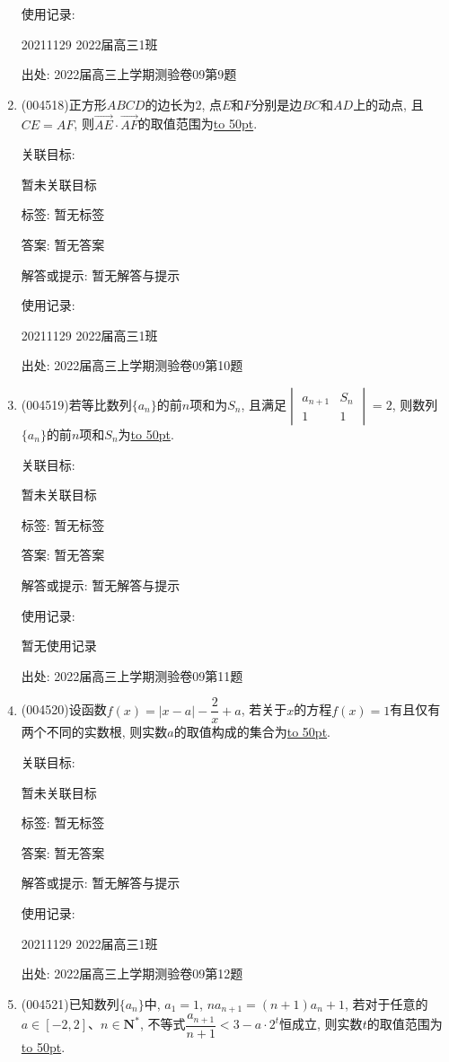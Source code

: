 \documentclass[10pt,a4paper]{article}
\newcommand{\blank}[1]{\underline{\hbox to #1pt{}}}
\begin{document}
\begin{enumerate}[1.]
使用记录:

20211129	2022届高三1班	


出处: 2022届高三上学期测验卷09第9题
\item { (004518)}正方形$ABCD$的边长为$2$, 点$E$和$F$分别是边$BC$和$AD$上的动点, 且$CE=AF$, 则$\overrightarrow{AE}\cdot \overrightarrow{AF}$的取值范围为\blank{50}.


关联目标:

暂未关联目标



标签: 暂无标签

答案: 暂无答案

解答或提示: 暂无解答与提示

使用记录:

20211129	2022届高三1班	


出处: 2022届高三上学期测验卷09第10题
\item { (004519)}若等比数列$\{a_n\}$的前$n$项和为$S_n$, 且满足$\begin{vmatrix}
a_{n+1} &  S_n  \\ 1 & 1  \end{vmatrix}=2$, 则数列$\{a_n\}$的前$n$项和$S_n$为\blank{50}.


关联目标:

暂未关联目标



标签: 暂无标签

答案: 暂无答案

解答或提示: 暂无解答与提示

使用记录:

暂无使用记录


出处: 2022届高三上学期测验卷09第11题
\item { (004520)}设函数$f(x)=|x-a|-\dfrac 2x+a$, 若关于$x$的方程$f(x)=1$有且仅有两个不同的实数根, 则实数$a$的取值构成的集合为\blank{50}.


关联目标:

暂未关联目标



标签: 暂无标签

答案: 暂无答案

解答或提示: 暂无解答与提示

使用记录:

20211129	2022届高三1班	


出处: 2022届高三上学期测验卷09第12题
\item { (004521)}已知数列$\{a_n\}$中, $a_1=1$, $na_{n+1}=(n+1)a_n+1$, 若对于任意的$a\in [-2,2]$、$n\in \mathbf{N}^*$, 不等式$\dfrac{a_{n+1}}{n+1}<3-a\cdot {2^t}$恒成立, 则实数$t$的取值范围为\blank{50}.



\end{enumerate}
\end{document}

